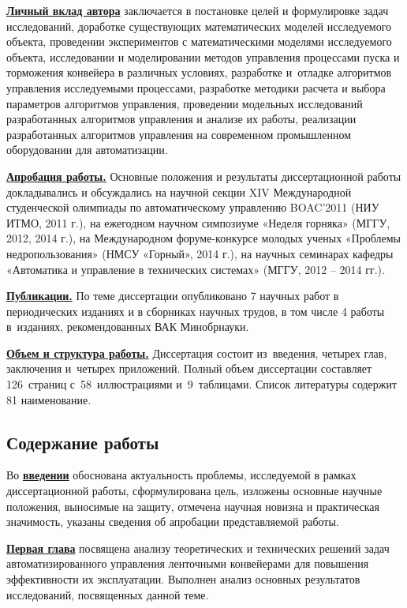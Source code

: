 \underline{\textbf{Личный вклад автора}} заключается в постановке целей и формулировке задач исследований, доработке существующих математических моделей исследуемого объекта, проведении экспериментов с математическими моделями исследуемого объекта, исследовании и моделировании методов управления процессами пуска и торможения конвейера в различных условиях, разработке и~отладке алгоритмов управления исследуемыми процессами, разработке методики расчета и выбора параметров алгоритмов управления, проведении модельных исследований разработанных алгоритмов управления и анализе их работы, реализации разработанных алгоритмов управления на современном промышленном оборудовании для автоматизации.
\bigskip

\underline{\textbf{Апробация работы.}} Основные положения и результаты диссертационной работы докладывались и обсуждались на научной секции XIV Международной студенческой олимпиады по автоматическому управлению BOAC’2011 (НИУ ИТМО, 2011 г.), на ежегодном научном симпозиуме «Неделя горняка» (МГГУ, 2012, 2014 г.), на Международном форуме-конкурсе молодых ученых «Проблемы недропользования» (НМСУ «Горный», 2014 г.), на научных семинарах кафедры «Автоматика и управление в технических системах» (МГГУ, 2012 -- 2014 гг.).
\bigskip

\underline{\textbf{Публикации.}} По теме диссертации опубликовано 7 научных работ в периодических изданиях и в сборниках научных трудов, в том числе 4 работы в~изданиях, рекомендованных ВАК Минобрнауки.
\bigskip

\underline{\textbf{Объем и структура работы.}} Диссертация состоит из~введения, четырех глав, заключения и~четырех приложений. Полный объем диссертации составляет 126~страниц с~58~иллюстрациями и~9~таблицами. Список литературы содержит 81 наименование.

\subsection*{\Large Содержание работы}

Во \underline{\textbf{введении}} обоснована актуальность проблемы, исследуемой в рамках диссертационной работы, сформулирована цель, изложены основные научные положения, выносимые на защиту, отмечена научная новизна и практическая значимость, указаны сведения об апробации представляемой работы.
\bigskip

\underline{\textbf{Первая глава}} посвящена анализу теоретических и технических решений задач автоматизированного управления ленточными конвейерами для повышения эффективности их эксплуатации. Выполнен анализ основных результатов исследований, посвященных данной теме.

